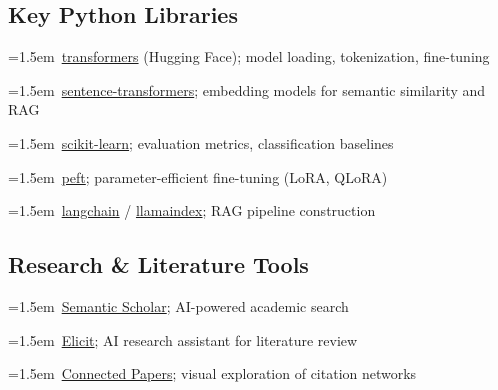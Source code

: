 \documentclass[11pt, a4paper]{article}
\newcommand{\resource}[1]{%
  \par\hangindent=1.5em\hangafter=1\noindent\hspace{0.5em}{\small\textcolor{accent}{\guilsinglright}}~{\small #1}\par
}
\begin{document}
\subsection{Key Python Libraries}

\resource{\href{https://huggingface.co/docs/transformers}{transformers} (Hugging Face); model loading, tokenization, fine-tuning}
\resource{\href{https://www.sbert.net}{sentence-transformers}; embedding models for semantic similarity and RAG}
\resource{\href{https://scikit-learn.org}{scikit-learn}; evaluation metrics, classification baselines}
\resource{\href{https://github.com/huggingface/peft}{peft}; parameter-efficient fine-tuning (LoRA, QLoRA)}
\resource{\href{https://python.langchain.com}{langchain} / \href{https://www.llamaindex.ai}{llamaindex}; RAG pipeline construction}

\subsection{Research \& Literature Tools}

\resource{\href{https://www.semanticscholar.org}{Semantic Scholar}; AI-powered academic search}
\resource{\href{https://elicit.com}{Elicit}; AI research assistant for literature review}
\resource{\href{https://www.connectedpapers.com}{Connected Papers}; visual exploration of citation networks}
\end{document}
